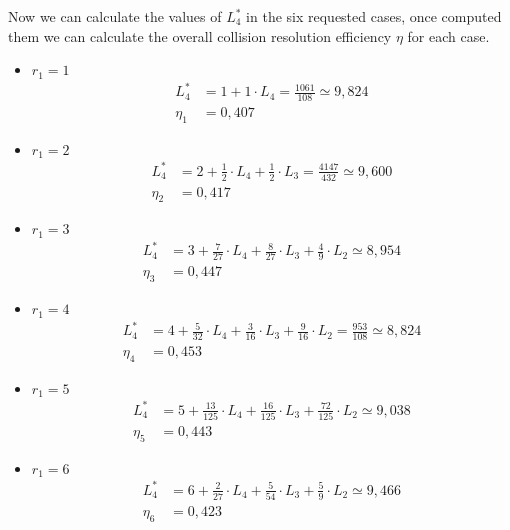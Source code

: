 Now we can calculate the values of $L_4^*$ in the six requested cases, once computed them we can calculate the overall collision resolution efficiency $\eta$ for each case.

\begin{itemize}
\item $r_1 = 1$
\begin{equation}
\begin{split}
L_4^* & = 1 + 1 \cdot L_4 = \frac{1061}{108} \simeq 9,824 \\
\eta_1 & = 0,407
\end{split}
\end{equation}

\item $r_1 = 2$
\begin{equation}
\begin{split}
L_4^* & = 2 + \frac{1}{2} \cdot L_4 + \frac{1}{2} \cdot L_3 = \frac{4147}{432} \simeq 9,600 \\
\eta_2 & = 0,417
\end{split}
\end{equation}

\item $r_1 = 3$
\begin{equation}
\begin{split}
L_4^* & = 3 + \frac{7}{27} \cdot L_4 + \frac{8}{27} \cdot L_3 + \frac{4}{9} \cdot L_2 \simeq 8,954 \\
\eta_3 & = 0,447
\end{split}
\end{equation}

\item $r_1 = 4$
\begin{equation}
\begin{split}
L_4^* & = 4 + \frac{5}{32} \cdot L_4 + \frac{3}{16} \cdot L_3 + \frac{9}{16} \cdot L_2 = \frac{953}{108} \simeq 8,824 \\
\eta_4 & = 0,453
\end{split}
\end{equation}

\item $r_1 = 5$
\begin{equation}
\begin{split}
L_4^* & = 5 + \frac{13}{125} \cdot L_4 + \frac{16}{125} \cdot L_3 + \frac{72}{125} \cdot L_2 \simeq 9,038 \\
\eta_5 & = 0,443
\end{split}
\end{equation}

\item $r_1 = 6$
\begin{equation}
\begin{split}
L_4^* & = 6 + \frac{2}{27} \cdot L_4 + \frac{5}{54} \cdot L_3 + \frac{5}{9} \cdot L_2 \simeq 9,466 \\
\eta_6 & = 0,423
\end{split}
\end{equation}
\end{itemize}


